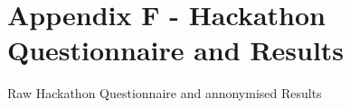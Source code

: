\cleardoublepage%
\chapter*{\label{chap:apx_f}Appendix F - Hackathon Questionnaire and Results}%
%

Raw Hackathon Questionnaire and annonymised Results